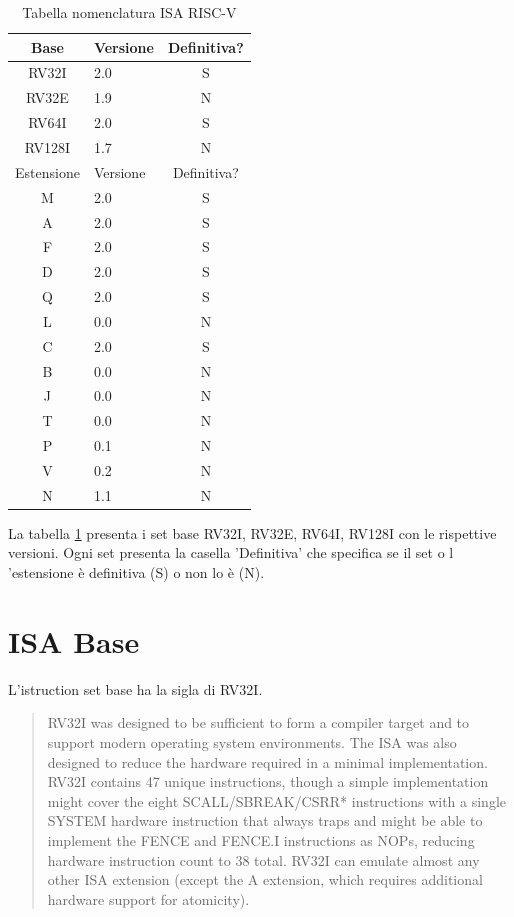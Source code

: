 \documentclass[12pt,a4paper]{report}
\begin{document}
\begin{table}
\centering
\begin{tabular}{|c|l|c|}
\hline
Base & Versione & Definitiva? \\
\hline
RV32I & 2.0 & S\\
RV32E & 1.9 & N\\
RV64I & 2.0 & S\\
RV128I & 1.7 & N\\
\hline
Estensione & Versione & Definitiva? \\
\hline
M & 2.0 & S\\
A & 2.0 & S\\
F & 2.0 & S\\
D & 2.0 & S\\
Q & 2.0 & S\\
L & 0.0 & N\\
C & 2.0 & S\\
B & 0.0 & N\\
J & 0.0 & N\\
T & 0.0 & N \\
P & 0.1 & N\\
V & 0.2 & N\\
N & 1.1 & N\\
\hline

\end{tabular}
	\caption{Tabella nomenclatura ISA RISC-V}
	\label{tab:nomenclaturaISA}
\end{table}

La tabella  \ref{tab:nomenclaturaISA}  presenta i set base RV32I, RV32E, RV64I, RV128I con le rispettive versioni. Ogni set presenta la casella 'Definitiva' che specifica se il set o l 'estensione è definitiva (S) o non lo è (N).

\section{ISA Base}
L'istruction set base ha la sigla di RV32I. 

\begin{quote}
RV32I was designed to be sufficient to form a compiler target and to support modern operating
system environments. The ISA was also designed to reduce the hardware required in a minimal implementation. RV32I contains 47 unique instructions, though a simple implementation
might cover the eight SCALL/SBREAK/CSRR* instructions with a single SYSTEM hardware
instruction that always traps and might be able to implement the FENCE and FENCE.I instructions as NOPs, reducing hardware instruction count to 38 total. RV32I can emulate almost
any other ISA extension (except the A extension, which requires additional hardware support for
atomicity).\cite{RISCV_ISA-DOC}
\end{quote}
\end{document}
